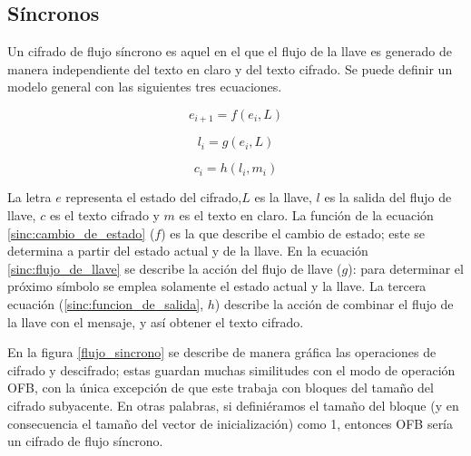 %
%

\subsection{Síncronos}

Un cifrado de flujo síncrono es aquel en el que el flujo de la llave es
generado de manera independiente del texto en claro y del texto cifrado. Se
puede definir un modelo general con las siguientes tres ecuaciones.

\begin{equation}
  \label{sinc:cambio_de_estado}
  e_{i+1} = f(e_i, L)
\end{equation}

\begin{equation}
  \label{sinc:flujo_de_llave}
  l_i = g(e_i, L)
\end{equation}

\begin{equation}
  \label{sinc:funcion_de_salida}
  c_i = h(l_i, m_i)
\end{equation}

\vspace{0.5cm}

La letra $ e $ representa el estado del cifrado,$ L $ es la llave, $ l $ es
la salida del flujo de llave, $ c $ es el texto cifrado y $ m $ es el texto en
claro. La función de la ecuación \ref{sinc:cambio_de_estado} ($ f $) es la que
describe el cambio de estado; este se determina a partir del estado actual y
de la llave. En la ecuación \ref{sinc:flujo_de_llave} se describe la acción del
flujo de llave ($ g $): para determinar el próximo símbolo se emplea solamente
el estado actual y la llave. La tercera ecuación (\ref{sinc:funcion_de_salida},
$ h $) describe la acción de combinar el flujo de la llave con el mensaje, y
así obtener el texto cifrado.


En la figura \ref{flujo_sincrono} se describe de manera gráfica las operaciones
de cifrado y descifrado; estas guardan muchas similitudes con el modo de
operación OFB, con la única excepción de que este trabaja con bloques del tamaño
del cifrado subyacente. En otras palabras, si definiéramos el tamaño del bloque
(y en consecuencia el tamaño del vector de inicialización) como 1, entonces
OFB sería un cifrado de flujo síncrono.

\vspace{0.5cm}


